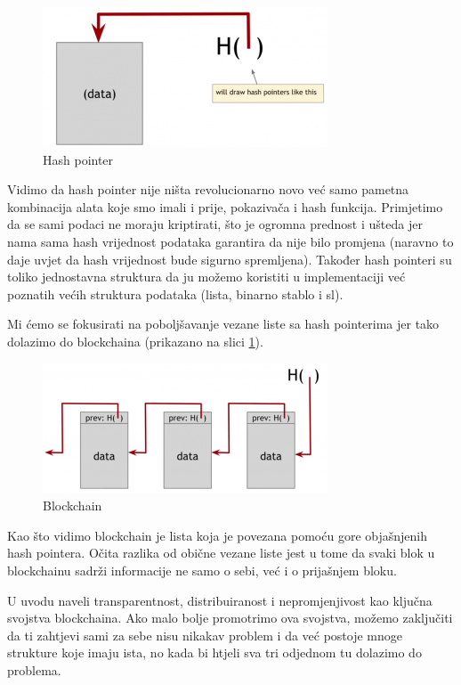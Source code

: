 \documentclass[12pt]{report}
\begin{document}
\begin{figure}[h]
\centering
\includegraphics[scale=0.5]{hash_pointer}
\caption{Hash pointer}
\end{figure}

Vidimo da hash pointer nije ništa revolucionarno novo već samo pametna kombinacija alata koje smo imali i prije, pokazivača i hash funkcija. Primjetimo da se sami podaci ne moraju kriptirati, što je ogromna prednost i ušteda jer nama sama hash vrijednost podataka garantira da nije bilo promjena (naravno to daje uvjet da hash vrijednost bude sigurno spremljena). Također hash pointeri su toliko jednostavna struktura da ju možemo koristiti u implementaciji već poznatih većih struktura podataka (lista, binarno stablo i sl).

Mi ćemo se fokusirati na poboljšavanje vezane liste sa hash pointerima jer tako dolazimo do blockchaina (prikazano na slici \ref{fig:blockchain}).

\begin{figure}[!]
\centering
\includegraphics[scale=0.8]{blockchain}
\caption{Blockchain}
\label{fig:blockchain}
\end{figure}

Kao što vidimo blockchain je lista koja je povezana pomoću gore objašnjenih hash pointera. Očita razlika od obične vezane liste jest u tome da svaki blok u blockchainu sadrži informacije ne samo o sebi, već i o prijašnjem bloku. 

U uvodu naveli transparentnost, distribuiranost i nepromjenjivost kao ključna svojstva blockchaina. Ako malo bolje promotrimo ova svojstva, možemo zaključiti da ti zahtjevi sami za sebe nisu nikakav problem i da već postoje mnoge strukture koje imaju ista, no kada bi htjeli sva tri odjednom tu dolazimo do problema.
\end{document}
